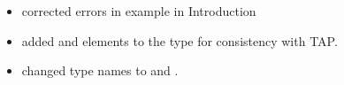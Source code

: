 \documentclass[11pt,a4paper]{ivoa}
\begin{document}
\begin{itemize}
  \item corrected errors in example in Introduction
  \item added  and
        elements to the
        type for consistency with TAP.
  \item changed type names  to
        and 
       .
\end{itemize}


\end{document}
